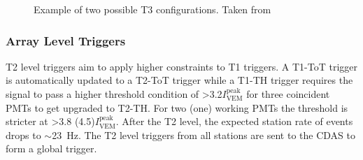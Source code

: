 \begin{figure}[t!]
  \centering
  \hfill
  \caption{Example of two possible T3 configurations. Taken from~\cite{PierreAuger:2010zof}}
  \label{fig:T3_config}
\end{figure}

\subsubsection{Array Level Triggers}
\label{sec:Sur_det_trig_array}
T2 level triggers aim to apply higher constraints to T1 triggers. A T1-ToT trigger is automatically updated to a T2-ToT trigger while a T1-TH trigger requires the signal to pass a higher threshold condition of >3.2$I_{\text{VEM}}^{\text{peak}}$ for three coincident PMTs to get upgraded to T2-TH. For two (one) working PMTs the threshold is stricter at >3.8 (4.5)$I_{\text{VEM}}^{\text{peak}}$. After the T2 level, the expected station rate of events drops to $\sim$23 Hz. The T2 level triggers from all stations are sent to the CDAS to form a global trigger.

